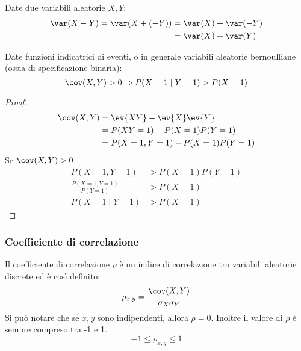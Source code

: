 \begin{prop}
	Date due variabili aleatorie $X, Y$:
	\begin{align*}
		\var(X - Y) = \var(X + (-Y)) & = \var(X) + \var(-Y) \\
			& = \var(X) + \var(Y) \\
	\end{align*}
\end{prop}


\begin{prop}
	Date funzioni indicatrici di eventi, o in generale variabili aleatorie bernoulliane (ossia di specificazione binaria):
	\begin{equation*}
		\cov(X,Y)>0 \Rightarrow P(X=1\mid Y=1)>P(X=1)
	\end{equation*}
\end{prop}

\begin{proof}
	\begin{align*}
		\cov(X,Y) & = \ev{XY} - \ev{X}\ev{Y}  \\
		          & = P(XY=1)-P(X=1)P(Y=1)    \\
		          & = P(X=1,Y=1)-P(X=1)P(Y=1) \\
	\end{align*}
	Se $\cov(X,Y)>0$
	\begin{align*}
		P(X=1,Y=1)                & > P(X=1)P(Y=1) \\
		\frac{P(X=1,Y=1)}{P(Y=1)} & > P(X=1)       \\
		P(X=1\mid Y=1)            & > P(X=1)
	\end{align*}
\end{proof}


\subsubsection{Coefficiente di correlazione}
\begin{defin}
	Il coefficiente di correlazione $\rho$ è un indice di correlazione tra variabili aleatorie discrete ed è così definito:
	\begin{equation*}
		\rho_{x,y}= \frac{\cov(X,Y)}{\sigma_X\sigma_Y}
	\end{equation*}
	Si può notare che se $x, y$ sono indipendenti, allora $\rho = 0$. Inoltre il valore di $\rho$ è sempre compreso tra -1 e 1.
	\begin{equation*}
		-1 \leq \rho_{x, y} \leq 1
	\end{equation*}
\end{defin}
